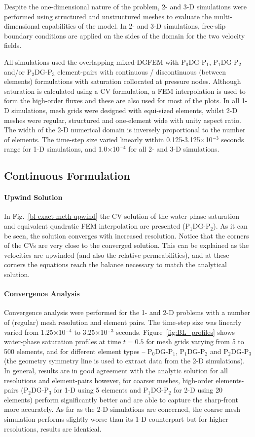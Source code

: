 \documentclass[preprint,authoryear,12pt]{elsarticle}
\newcommand{\PN}[2][error]{P$_{#1}$DG-P$_{#2}$}
\begin{document}
Despite the one-dimensional nature of the problem, 2- and 3-D simulations were performed using structured and unstructured meshes to evaluate the multi-dimensional capabilities of the model. In 2- and 3-D simulations, free-slip boundary conditions are applied on the sides of the domain for the two velocity fields.

 All simulations used the overlapping mixed-DGFEM with \PN[0]{1}, \PN[1]{2} and/or \PN[2]{3} element-pairs with continuous / discontinuous (between elements) formulations with saturation collocated at pressure nodes. Although saturation is calculated using a CV formulation, a FEM interpolation is used to form the high-order fluxes and these are also used for most of the plots. In all 1-D simulations, mesh grids were designed with equi-sized elements, whilst 2-D meshes were regular, structured and one-element wide with unity aspect ratio. The width of the 2-D numerical domain is inversely proportional to the number of elements. The time-step size varied linearly within 0.125-3.125$\times$10$^{-3}$ seconds range for 1-D simulations, and 1.0$\times$10$^{-4}$ for all 2- and 3-D simulations.

\subsection{Continuous Formulation}
\paragraph{Upwind Solution} 
In Fig.~\ref{bl-exact-meth-upwind} the CV solution of the water-phase saturation and equivalent quadratic FEM interpolation are presented (\PN[1]{2}). As it can be seen, the solution converges with increased resolution. Notice that the corners of the CVs are very close to the converged solution. This can be explained as the velocities are upwinded (and also the relative permeabilities), and at these corners the equations reach the balance necessary to match the analytical solution.

\paragraph{Convergence Analysis}
Convergence analysis were performed for the 1- and 2-D problems with a number of (regular) mesh resolution and element pairs. The time-step size was linearly varied from 1.25$\times$10$^{-4}$ to 3.25$\times$10$^{-3}$ seconds. Figure~\ref{fig:BL_profiles} shows water-phase saturation profiles at time $t=0.5$ for mesh grids varying from 5 to 500 elements, and for different element types -- \PN[0]{1}, \PN[1]{2} and \PN[2]{3} (the geometry symmetry line is used to extract data from the 2-D simulations).  In general, results are in good agreement with the analytic solution for all resolutions and element-pairs however, for coarser meshes, high-order elements-pairs (\PN[2]{3} for 1-D using 5 elements and \PN[1]{2} for 2-D using 20 elements) perform significantly better and are able to capture the sharp-front more accurately. As far as the 2-D simulations are concerned, the coarse mesh simulation performs slightly worse than its 1-D counterpart but for higher resolutions, results are identical.
\end{document}
